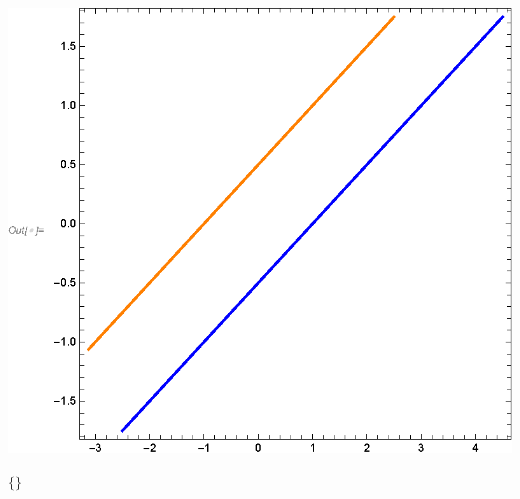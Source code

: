 \documentclass{article}
\begin{document}
\includegraphics{HWork02_linear_eqs_gr3.eps}

\begin{doublespace}
\noindent\(\{\}\)
\end{doublespace}
\end{document}
